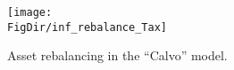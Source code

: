 \hypertarget{inf_rebalance_Tax}{}
\begin{figure}[tbp]
\centerline{\texttt{[image: \\FigDir/inf\_rebalance\_Tax]}}
\caption{Asset rebalancing in the ``Calvo'' model.}
\label{fig:inf_rebalance_Tax}
\end{figure}